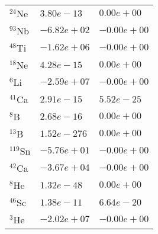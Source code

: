 \begin{tabular}{lll}
 $^{24}$Ne  & $3.80e-13 $                                                        & $0.00e+00 $                                                                     \\
 $^{93}$Nb  & $-6.82e+02 $                                                       & $-0.00e+00 $                                                                    \\
 $^{48}$Ti  & $-1.62e+06 $                                                       & $-0.00e+00 $                                                                    \\
 $^{18}$Ne  & $4.28e-15 $                                                        & $0.00e+00 $                                                                     \\
 $^{6}$Li   & $-2.59e+07 $                                                       & $-0.00e+00 $                                                                    \\
 $^{41}$Ca  & $2.91e-15 $                                                        & $5.52e-25 $                                                                     \\
 $^{8}$B    & $2.68e-16 $                                                        & $0.00e+00 $                                                                     \\
 $^{13}$B   & $1.52e-276 $                                                       & $0.00e+00 $                                                                     \\
 $^{119}$Sn & $-5.76e+01 $                                                       & $-0.00e+00 $                                                                    \\
 $^{42}$Ca  & $-3.67e+04 $                                                       & $-0.00e+00 $                                                                    \\
 $^{8}$He   & $1.32e-48 $                                                        & $0.00e+00 $                                                                     \\
 $^{46}$Sc  & $1.38e-11 $                                                        & $6.64e-20 $                                                                     \\
 $^{3}$He   & $-2.02e+07 $                                                       & $-0.00e+00 $                                                                    \\

\end{tabular}
